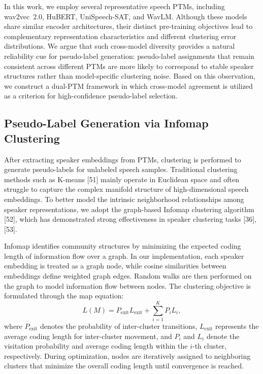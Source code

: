 \documentclass[lettersize,journal]{IEEEtran}
\begin{document}
In this work, we employ several representative speech PTMs, including wav2vec~2.0, HuBERT, UniSpeech-SAT, and WavLM. Although these models share similar encoder architectures, their distinct pre-training objectives lead to complementary representation characteristics and different clustering error distributions. We argue that such cross-model diversity provides a natural reliability cue for pseudo-label generation: pseudo-label assignments that remain consistent across different PTMs are more likely to correspond to stable speaker structures rather than model-specific clustering noise. Based on this observation, we construct a dual-PTM framework in which cross-model agreement is utilized as a criterion for high-confidence pseudo-label selection.

\subsection{Pseudo-Label Generation via Infomap Clustering}

After extracting speaker embeddings from PTMs, clustering is performed to generate pseudo-labels for unlabeled speech samples. Traditional clustering methods such as K-means [51] mainly operate in Euclidean space and often struggle to capture the complex manifold structure of high-dimensional speech embeddings. To better model the intrinsic neighborhood relationships among speaker representations, we adopt the graph-based Infomap clustering algorithm [52], which has demonstrated strong effectiveness in speaker clustering tasks [36], [53].

Infomap identifies community structures by minimizing the expected coding length of information flow over a graph. In our implementation, each speaker embedding is treated as a graph node, while cosine similarities between embeddings define weighted graph edges. Random walks are then performed on the graph to model information flow between nodes. The clustering objective is formulated through the map equation:
\begin{equation}
L(M)
=
P_{\mathrm{exit}}L_{\mathrm{exit}}
+
\sum_{i=1}^{K}
P_iL_i,
\end{equation}
where $P_{\mathrm{exit}}$ denotes the probability of inter-cluster transitions, $L_{\mathrm{exit}}$ represents the average coding length for inter-cluster movement, and $P_i$ and $L_i$ denote the visitation probability and average coding length within the $i$-th cluster, respectively. During optimization, nodes are iteratively assigned to neighboring clusters that minimize the overall coding length until convergence is reached.
\end{document}
